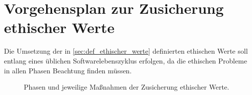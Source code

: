 \section{Vorgehensplan zur Zusicherung ethischer Werte}\label{sec:massnahmen}
Die Umsetzung der in \autoref{sec:def_ethischer_werte} definierten ethischen Werte soll entlang eines üblichen Softwarelebenszyklus \cite[S. 64]{broy2013} erfolgen, da die ethischen Probleme in allen Phasen Beachtung finden müssen.

\begin{figure}[ht]
    \centering
    \caption{Phasen und jeweilige Maßnahmen der Zusicherung ethischer Werte.}
    \label{fig:guidelines}
\end{figure}


